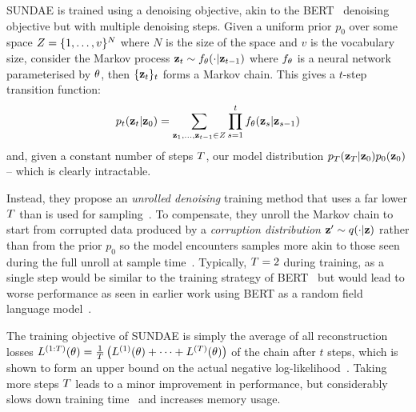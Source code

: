 SUNDAE is trained using a denoising objective, akin to the
BERT~\cite{wang2019bert} denoising objective but with multiple denoising steps.
Given a uniform prior $p_0$ over some space $Z = \{1, \dots,
v\}^N$ where $N$ is the size of the space and $v$ is the
vocabulary size, consider the Markov process $\mathbf{z}_t \sim f_\theta(\cdot \vert
\mathbf{z}_{t-1})$ where $f_\theta$ is a neural network parameterised by
$\theta$, then $\{\mathbf{z}_t\}_t$ forms a Markov chain. This gives a
$t$-step transition function: \begin{equation}\label{eq:markov} p_t(\mathbf{z}_t
    \vert \mathbf{z}_0) = \sum\limits_{\mathbf{z}_1, \dots, \mathbf{z}_{t-1} \in
    Z} \prod\limits^t_{s=1} f_\theta(\mathbf{z}_s | \mathbf{z}_{s-1})
\end{equation}\cite{savinov2022stepunrolled} and, given a constant number of
steps $T$, our model distribution
$p_T(\mathbf{z}_T \vert \mathbf{z}_0)p_0(\mathbf{z}_0)$ -- which is
clearly intractable.

Instead, they propose an \textit{unrolled denoising} training method that uses a
far lower $T$ than is used for
sampling~\cite{savinov2022stepunrolled}. To compensate, they unroll the Markov
chain to start from corrupted data produced by a \textit{corruption
distribution} $\mathbf{z}' \sim q(\cdot \vert \mathbf{z})$ rather than from the prior $p_0$ so the model
encounters samples more akin to those seen during the full unroll at sample
time~\cite{savinov2022stepunrolled}. Typically, $T
= 2$ during training, as a single step would be similar to the
training strategy of BERT~\cite{devlin2019bert} but would lead to worse
performance as seen in earlier work using BERT as a random field language
model~\cite{wang2019bert}.

The training objective of SUNDAE is simply the average of all reconstruction
losses $L^{(1:T)}(\theta) = \frac{1}{T} \left(L^{(1)}(\theta) + \dots +
L^{(T)}(\theta) \right)$ of the chain after $t$ steps, which is shown to form
an upper bound on the actual negative
log-likelihood~\cite{savinov2022stepunrolled}. Taking more steps $T$
leads to a minor improvement in performance, but considerably slows down
training time~\cite{savinov2022stepunrolled} and increases memory usage.


